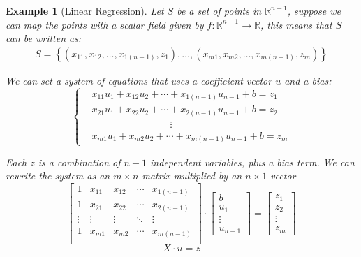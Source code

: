 \documentclass{book}
\newtheorem{example}{Example}[chapter]
\begin{document}
\begin{example}[Linear Regression]
    Let $S$ be a set of points in $\mathbb{R}^{n-1}$, suppose we can map the points
    with a scalar field given by $f:\mathbb{R}^{n-1}\to\mathbb{R}$, this means that
    $S$ can be written as:
    \begin{equation}
        \begin{split}
            S = \left\{\left(x_{11},x_{12},\dots,x_{1(n-1)},z_{1} \right), \dots, \left(x_{m1}, x_{m2},\dots,x_{m(n-1)}, z_m\right)\right\}
        \end{split}
    \end{equation}

    We can set a system of equations that uses a coefficient vector $u$ and a
    \textit{bias}:
    \begin{equation}
        \begin{cases}
             & x_{11}u_1 + x_{12}u_2 + \cdots + x_{1(n-1)}u_{n-1} + b = z_1
            \\                                                         & x_{21}u_1 + x_{22}u_2 + \cdots + x_{2(n-1)}u_{n-1} + b = z_2
            \\                                                         & \qquad \qquad \qquad \qquad \vdots
            \\ &x_{m1}u_1 + x_{m2}u_2 + \cdots + x_{m(n-1)}u_{n-1} + b = z_m
        \end{cases}
    \end{equation}

    Each $z$ is a combination of $n-1$ independent variables, plus a bias term. We
    can rewrite the system as an $m\times n$ matrix multiplied by an $n\times 1$
    vector
    \begin{equation}
        \left[
            \begin{matrix}
                1      & x_{11} & x_{12} & \cdots & x_{1(n-1)} \\
                1      & x_{21} & x_{22} & \cdots & x_{2(n-1)} \\
                \vdots & \vdots & \vdots & \ddots & \vdots     \\
                1      & x_{m1} & x_{m2} & \cdots & x_{m(n-1)} \\
            \end{matrix}
            \right]\cdot \left[
            \begin{matrix}
                b \\ u_1 \\\vdots\\u_{n-1}
            \end{matrix}
            \right] = \left[
            \begin{matrix}
                z_1 \\z_2\\\vdots\\z_m
            \end{matrix}
            \right]
    \end{equation}
    \begin{equation*}
        X\cdot u = z
    \end{equation*}


\end{example}
\end{document}
